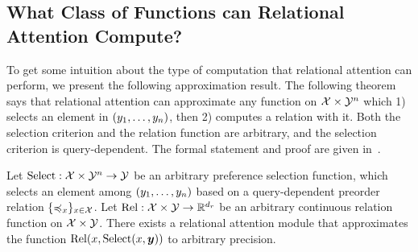 \subsection{What Class of Functions can Relational Attention Compute?}\label{ssec:approx}

To get some intuition about the type of computation that relational attention can perform, we present the following approximation result. The following theorem says that relational attention can approximate any function on ${\mathcal{X}} \times {\mathcal{Y}}^n$ which 1) selects an element in $(y_1, \ldots, y_n)$, then 2) computes a relation with it. Both the selection criterion and the relation function are arbitrary, and the selection criterion is query-dependent. The formal statement and proof are given in~.
\begin{theorem}[Informal]\label{theorem:func_class}
  Let $\mathrm{Select}: {\mathcal{X}} \times {\mathcal{Y}}^n \to {\mathcal{Y}}$ be an arbitrary preference selection function, which selects an element among $(y_1, \ldots, y_n)$ based on a query-dependent preorder relation $\{\preccurlyeq_x\}_{x \in {\mathcal{X}}}$. Let $\mathrm{Rel}: {\mathcal{X}} \times {\mathcal{Y}} \to \mathbb{R}^{d_r}$ be an arbitrary continuous relation function on ${\mathcal{X}} \times {\mathcal{Y}}$. There exists a relational attention module that approximates the function $\mathrm{Rel}(x, \mathrm{Select}(x, \bm{y}))$ to arbitrary precision.
\end{theorem}
